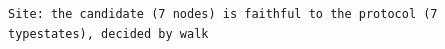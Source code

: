 \begin{lstlisting}[language={},basicstyle=\ttfamily\footnotesize,breaklines=true]
Site: the candidate (7 nodes) is faithful to the protocol (7 typestates), decided by walk
\end{lstlisting}

